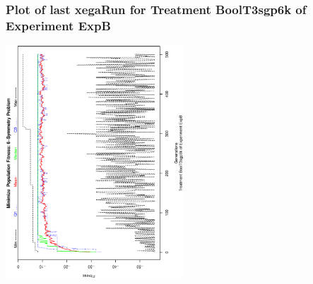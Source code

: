  \begin{frame}
 \frametitle{ Plot of last xegaRun for Treatment BoolT3sgp6k of Experiment ExpB }
 \begin{center}
\includegraphics[width=0.5\textwidth, angle=-90]
{ExpBPlotPopStatsFigure019.eps}
 \end{center}
 \label{report/ExpBPlotPopStatsFigure019.eps}  
 \end{frame}


